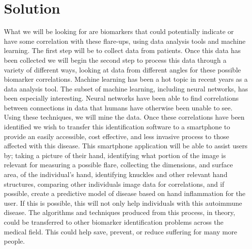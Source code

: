 \documentclass[10pt,journal,draftclsnofoot,onecolumn]{IEEEtran}
\begin{document}
\section{Solution}
What we will be looking for are biomarkers that could potentially indicate or have some correlation with these flare-ups, using data analysis tools and machine learning. The first step will be to collect data from patients. Once this data has been collected we will begin the second step to process this data through a variety of different ways, looking at data from different angles for these possible biomarker correlations.
Machine learning has been a hot topic in recent years as a data analysis tool. The subset of machine learning, including neural networks, has been especially interesting. Neural networks have been able to find correlations between connections in data that humans have otherwise been unable to see. Using these techniques, we will mine the data. Once these correlations have been identified we wish to transfer this identification software to a smartphone to provide an easily accessible, cost effective, and less invasive process to those affected with this disease. This smartphone application will be able to assist users by; taking a picture of their hand, identifying what portion of the image is relevant for measuring a possible flare, collecting the dimensions, and surface area, of the individual’s hand, identifying knuckles and other relevant hand structures, comparing other individuals image data for correlations, and if possible, create a predictive model of disease based on hand inflammation for the user.
If this is possible, this will not only help individuals with this autoimmune disease. The algorithms and techniques produced from this process, in theory, could be transferred to other biomarker identification problems across the medical field. This could help save, prevent, or reduce suffering for many more people. 
\end{document}
